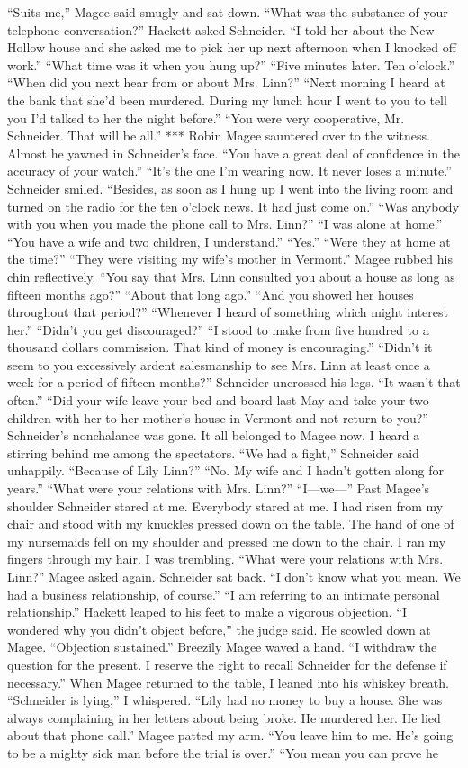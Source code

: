 \documentclass{novel}
\begin{document}
“Suits me,” Magee said smugly and sat down. “What was the substance of your telephone conversation?” Hackett asked Schneider. “I told her about the New Hollow house and she asked me to pick her up next afternoon when I knocked off work.” “What time was it when you hung up?” “Five minutes later. Ten o’clock.” “When did you next hear from or about Mrs. Linn?” “Next morning I heard at the bank that she’d been murdered. During my lunch hour I went to you to tell you I’d talked to her the night before.” “You were very cooperative, Mr. Schneider. That will be all.” *** Robin Magee sauntered over to the witness. Almost he yawned in Schneider’s face. “You have a great deal of confidence in the accuracy of your watch.” “It’s the one I’m wearing now. It never loses a minute.” Schneider smiled. “Besides, as soon as I hung up I went into the living room and turned on the radio for the ten o’clock news. It had just come on.” “Was anybody with you when you made the phone call to Mrs. Linn?” “I was alone at home.” “You have a wife and two children, I understand.” “Yes.” “Were they at home at the time?” “They were visiting my wife’s mother in Vermont.” Magee rubbed his chin reflectively. “You say that Mrs. Linn consulted you about a house as long as fifteen months ago?” “About that long ago.” “And you showed her houses throughout that period?” “Whenever I heard of something which might interest her.” “Didn’t you get discouraged?” “I stood to make from five hundred to a thousand dollars commission. That kind of money is encouraging.” “Didn’t it seem to you excessively ardent salesmanship to see Mrs. Linn at least once a week for a period of fifteen months?” Schneider uncrossed his legs. “It wasn’t that often.” “Did your wife leave your bed and board last May and take your two children with her to her mother’s house in Vermont and not return to you?” Schneider’s nonchalance was gone. It all belonged to Magee now. I heard a stirring behind me among the spectators. “We had a fight,” Schneider said unhappily. “Because of Lily Linn?” “No. My wife and I hadn’t gotten along for years.” “What were your relations with Mrs. Linn?” “I—we—” Past Magee’s shoulder Schneider stared at me. Everybody stared at me. I had risen from my chair and stood with my knuckles pressed down on the table. The hand of one of my nursemaids fell on my shoulder and pressed me down to the chair. I ran my fingers through my hair. I was trembling. “What were your relations with Mrs. Linn?” Magee asked again. Schneider sat back. “I don’t know what you mean. We had a business relationship, of course.” “I am referring to an intimate personal relationship.” Hackett leaped to his feet to make a vigorous objection. “I wondered why you didn’t object before,” the judge said. He scowled down at Magee. “Objection sustained.” Breezily Magee waved a hand. “I withdraw the question for the present. I reserve the right to recall Schneider for the defense if necessary.” When Magee returned to the table, I leaned into his whiskey breath. “Schneider is lying,” I whispered. “Lily had no money to buy a house. She was always complaining in her letters about being broke. He murdered her. He lied about that phone call.” Magee patted my arm. “You leave him to me. He’s going to be a mighty sick man before the trial is over.” “You mean you can prove he 
\end{document}
